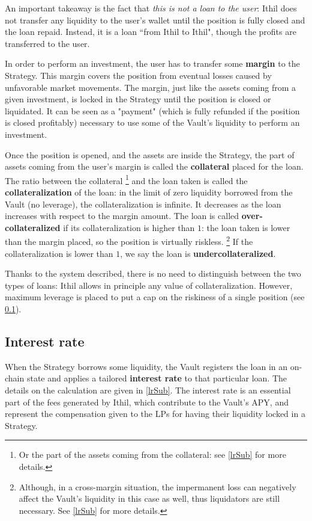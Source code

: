 \documentclass[a4paper,10 pt]{article}
\theoremstyle{definition}
\begin{document}
An important takeaway is the fact that {\it this is not a loan to the user}: Ithil does not transfer any liquidity to the user's wallet until the position is fully closed and the loan repaid. Instead, it is a loan ``from Ithil to Ithil", though the profits are transferred to the user.

In order to perform an investment, the user has to transfer some {\bf margin} to the Strategy. This margin covers the position from eventual losses caused by unfavorable market movements. The margin, just like the assets coming from a given investment, is locked in the Strategy until the position is closed or liquidated. It can be seen as a "payment" (which is fully refunded if the position is closed profitably) necessary to use some of the Vault's liquidity to perform an investment.

Once the position is opened, and the assets are inside the Strategy, the part of assets coming from the user's margin is called the {\bf collateral} placed for the loan. The ratio between the collateral \footnote{Or the part of the assets coming from the collateral: see \ref{lrSub} for more details.} and the loan taken is called the {\bf collateralization} of the loan: in the limit of zero liquidity borrowed from the Vault (no leverage), the collateralization is infinite. It decreases as the loan increases with respect to the margin amount. The loan is called {\bf over-collateralized} if its collateralization is higher than $1$: the loan taken is lower than the margin placed, so the position is virtually riskless. \footnote{Although, in a cross-margin situation, the impermanent loss can negatively affect the Vault's liquidity in this case as well, thus liquidators are still necessary. See \ref{lrSub} for more details.} If the collateralization is lower than $1$, we say the loan is {\bf undercollateralized}. 

Thanks to the system described, there is no need to distinguish between the two types of loans: Ithil allows in principle any value of collateralization. However, maximum leverage is placed to put a cap on the riskiness of a single position (see \ref{irSub}).

\subsection{Interest rate}\label{irSub}
When the Strategy borrows some liquidity, the Vault registers the loan in an on-chain state and applies a tailored {\bf interest rate} to that particular loan. The details on the calculation are given in \ref{lrSub}. The interest rate is an essential part of the fees generated by Ithil, which contribute to the Vault's APY, and represent the compensation given to the LPs for having their liquidity locked in a Strategy.
\end{document}
